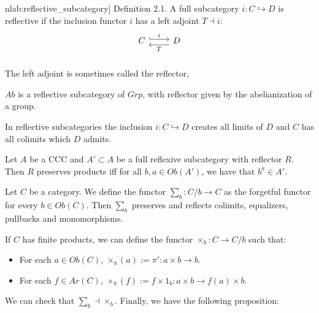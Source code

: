 \begin{definition}[\cite[Section 2]{nlab:reflective_subcategory}]
Definition 2.1. A full subcategory $i:C\hookrightarrow D$ is reflective if the inclusion functor $i$ has a left adjoint $T\dashv i$:
  \[
    \begin{tikzcd}
      C\arrow[hookrightarrow, shift left=.5ex, "i"{name=T}]{r}{} &
      D\arrow[ shift left=1ex, "T"{name=i}]{l}{} \\
    \end{tikzcd}
  \]
The left adjoint is sometimes called the reflector,
\end{definition}

\begin{example}

  $Ab$ is a reflective subcategory of $Grp$, with reflector given by the abelianization of a group.
\end{example}


\begin{proposition}
In reflective subcategories the inclusion $i:C\hookrightarrow D$ creates all limits of $D$ and $C$ has all colimits which $D$ admits.
\end{proposition}


\begin{proposition}
Let $A$ be a CCC and $A'\subset A$ be a full reflexive subcategory with reflector  $R$. Then $R$ preserves products iff for all $b,a\in Ob(A')$, we have that $b^a\in A'$.
\end{proposition}
\begin{proposition}
Let $C$ be a category. We define the functor $\sum_b : C/b \to C$ as the forgetful functor for every $b\in Ob(C)$. Then $\sum_b$ preserves and reflects colimits, equalizers, pullbacks and monomorphisms.
\end{proposition}

If $C$ has finite products, we can define the functor $\times_b: C \to C/b$ such that:
\begin{itemize}
\item For each $a\in Ob(C)$, $\times_b(a) := \pi':a\times b \to b$.
\item For each $f\in Ar(C)$, $\times_b(f) := f\times 1_b: a\times b \to f(a)\times b$.
\end{itemize}

We can check that $\sum_b \dashv \times_b$. Finally, we have the following proposition:

\begin{proposition}
  
\end{proposition}


